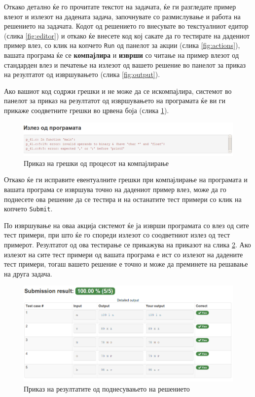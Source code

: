 Откако детално ќе го прочитате текстот на задачата, ќе ги разгледате пример
влезот и излезот на дадената задача, започнувате со размислување и работа на
решението на задачата. Кодот од решението го внесувате во текстуалниот едитор
(слика \ref{fig:editor}) и откако ќе внесете код кој сакате да го тестирате на
дадениот пример влез, со клик на копчето \texttt{Run} од панелот за акции
(слика \ref{fig:actions}), вашата програма ќе се \textbf{компајлира} и
\textbf{изврши} со читање на пример влезот од стандарден влез и печатење на
излезот од вашето решение во панелот за приказ на резултатот од извршувањето
(слика \ref{fig:output}).

Ако вашиот код содржи грешки и не може да се искомпајлира, системот во панелот
за приказ на резултатот од извршувањето на програмата ќе ви ги прикаже
соодветните грешки во црвена боја (слика \ref{fig:errors}).

\begin{figure}[htbp]
\centering
\includegraphics[scale=.4]{images/elab/errors}
\caption{Приказ на грешки од процесот на компајлирање}
\label{fig:errors}
\end{figure}

Откако ќе ги исправите евентуалните грешки при компајлирање на програмата и
вашата програма се извршува точно на дадениот пример влез, може да го поднесете
ова решение да се тестира и на останатите тест примери со клик на копчето
\texttt{Submit}.

По извршување на оваа акција системот ќе ја изврши програмата со влез од сите
тест примери, при што ќе го спореди излезот со соодветниот излез од тест
примерот. Резултатот од ова тестирање се прикажува на приказот на слика
\ref{fig:results}. Ако излезот на сите тест примери од вашата програма е ист со
излезот на дадените тест примери, тогаш вашето решение е точно и може да
преминете на решавање на друга задача.

\begin{figure}[htbp]
\centering
\includegraphics[scale=.4]{images/elab/results}
\caption{Приказ на резултатите од поднесувањето на решението}
\label{fig:results}
\end{figure}

